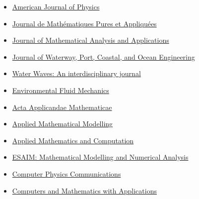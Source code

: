 \begin{itemize}
    \item[$\blacktriangleright$] \href{https://pubs.aip.org/aapt/ajp/}{American Journal of Physics}
    
    \item[$\blacktriangleright$] \href{http://www.journals.elsevier.com/journal-de-mathematiques-pures-et-appliquees/}%
    {Journal de Math\'ematiques Pures et Appliqu\'ees}

    \item[$\blacktriangleright$] \href{https://www.sciencedirect.com/journal/journal-of-mathematical-analysis-and-applications/}%
    {Journal of Mathematical Analysis and Applications}
    
    \item[$\blacktriangleright$] \href{http://ascelibrary.org/wwo/}%
    {Journal of Waterway, Port, Coastal, and Ocean Engineering}

    \item[$\blacktriangleright$] \href{https://link.springer.com/journal/42286/}{Water Waves: An interdisciplinary journal}

    \item[$\blacktriangleright$] \href{https://link.springer.com/journal/10652/}%
    {Environmental Fluid Mechanics}

    \item[$\blacktriangleright$] \href{https://link.springer.com/journal/10440/}%
    {Acta Applicandae Mathematicae}
    
    \item[$\blacktriangleright$] \href{http://www.journals.elsevier.com/applied-mathematical-modelling/}%
    {Applied Mathematical Modelling}
    
    \item[$\blacktriangleright$] \href{http://www.journals.elsevier.com/applied-mathematics-and-computation/}%
    {Applied Mathematics and Computation}

    \item[$\blacktriangleright$] \href{https://www.esaim-m2an.org/}%
   {ESAIM: Mathematical Modelling and Numerical Analysis}
    
    \item[$\blacktriangleright$] \href{https://www.journals.elsevier.com/computer-physics-communications}{Computer Physics Communications}
    
    \item[$\blacktriangleright$] \href{http://www.journals.elsevier.com/computers-and-mathematics-with-applications/}%
    {Computers and Mathematics with Applications}


\end{itemize}
